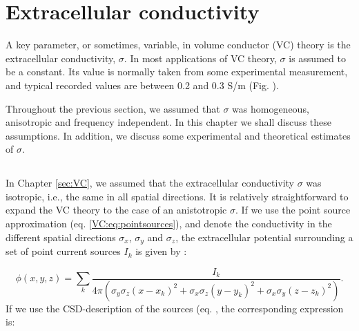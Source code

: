 \section{Extracellular conductivity}
\label{sec:Sigma}

A key parameter, or sometimes, variable, in volume conductor (VC) theory is the extracellular conductivity, $\sigma$. In most applications of VC theory, $\sigma$ is assumed to be a constant. Its value is normally taken from some experimental measurement, and typical recorded values are between 0.2 and 0.3 S/m (Fig. \label{Sigma:fig:freq_dep}).  

Throughout the previous section, we assumed that  $\sigma$  was homogeneous, anisotropic and frequency independent. In this chapter we shall discuss these assumptions. In addition, we discuss some experimental and theoretical estimates of  $\sigma$. 


\subsection{}
\label{sec:Sigma:Anisotropic}

In Chapter \ref{sec:VC}, we assumed that the extracellular conductivity $\sigma$ was isotropic, i.e., the same in all spatial directions. It is relatively straightforward to expand the VC theory to the case of an anistotropic $\sigma$. If we use the point source approximation (eq. \ref{VC:eq:pointsources}), and denote the conductivity in the different spatial directions $\sigma_x$, $\sigma_y$ and $\sigma_z$, the extracellular potential surrounding a set of point current sources $I_k$ is given by \citep{nicholson1975, Pettersen2012}:

\begin{equation}
\phi(x,y,z) = \sum_k \frac{I_k}{4\pi(\sigma_y\sigma_z (x-x_k)^2 + \sigma_x\sigma_z (y-y_k)^2 + \sigma_x\sigma_y (z-z_k)^2)}.
\label{Sigma:eq:Panisos}
\end{equation}
If we use the CSD-description of the sources (eq. \label{VC:eq:csds}, the corresponding expression is:

